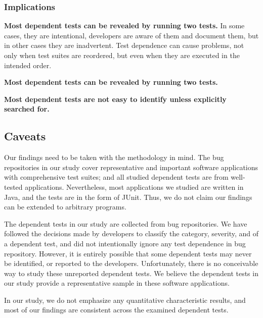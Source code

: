 



\subsubsection{Implications}

\vspace{1mm}
\noindent \textbf{Most dependent tests can be revealed by running two tests.}
In some cases, they are intentional, developers are aware
of them and document them, but in other cases they are
inadvertent. Test dependence can cause problems, not only
when test suites are reordered, but even when they are
executed in the intended order.

\vspace{1mm}
\noindent \textbf{Most dependent tests can be revealed by running two tests.}

\vspace{1mm}
\noindent \textbf{Most dependent tests are not easy to identify unless explicitly searched for.}

\subsection{Caveats}

Our findings need to be taken with the methodology in mind. The
bug repositories in our study cover representative and important
software applications with comprehensive test suites; and
all studied dependent tests are from well-tested
applications. Nevertheless, most applications we studied
are written in Java, and the tests are in the form of JUnit.
Thus, we do not claim our findings can be extended to
arbitrary programs.

The dependent tests in our study are collected from bug
repositories. We have followed the decisions made by
developers to classify the category, severity, and
 of a dependent test,
and did not intentionally ignore
any test dependence in bug repository. However,
it is entirely possible that some dependent tests may never
be identified, or reported to the developers. Unfortunately,
there is no conceivable way to study these unreported
dependent tests. We believe the dependent tests in our study
provide a representative sample in these software applications.

In our study, we do not emphasize any quantitative characteristic
results, and most of our findings are consistent across
the examined dependent tests.
